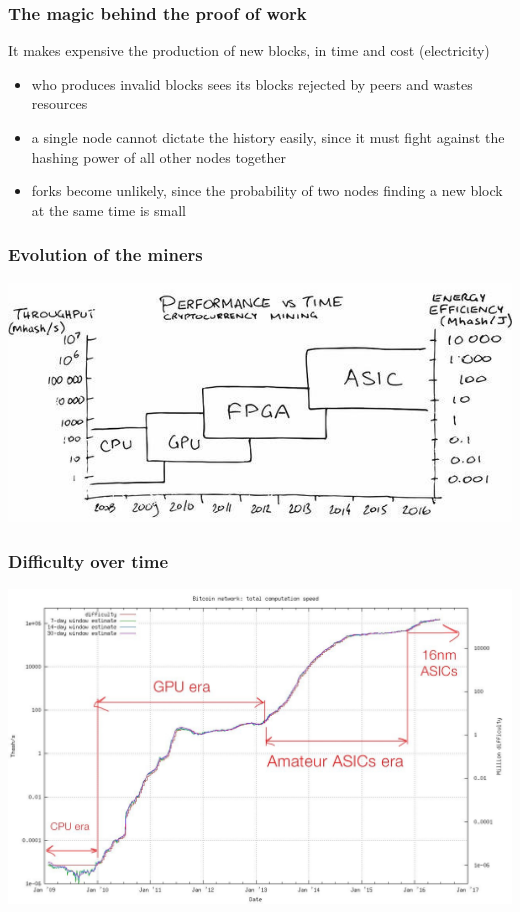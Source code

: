 \documentclass[11pt]{beamer}  %
\begin{document}
\begin{frame}\frametitle{The magic behind the proof of work}

  \begin{greenbox}{}
    It makes expensive the production of new blocks, in time and cost (electricity)
    \begin{itemize}
    \item who produces invalid blocks sees its blocks rejected by peers and wastes resources
    \item a single node cannot dictate the history easily, since it must fight against
      the hashing power of all other nodes together
    \item forks become unlikely, since the probability of two nodes finding a new block at the same time is small
    \end{itemize}
  \end{greenbox}

\end{frame}

\begin{frame}\frametitle{Evolution of the miners}

  \begin{center}
    \includegraphics[scale=0.55,clip=false]{pictures/mining-hardware.jpg}
  \end{center}

\end{frame}

\begin{frame}\frametitle{Difficulty over time}

  \begin{center}
    \includegraphics[width=\textwidth,clip=false]{pictures/difficulty.jpg}
  \end{center}

\end{frame}
\end{document}

